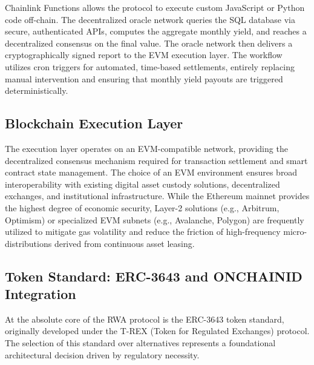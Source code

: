 \documentclass[12pt, a4paper]{article}
\begin{document}
Chainlink Functions allows the protocol to execute custom JavaScript or Python code off-chain. The decentralized oracle network queries the SQL database via secure, authenticated APIs, computes the aggregate monthly yield, and reaches a decentralized consensus on the final value. The oracle network then delivers a cryptographically signed report to the EVM execution layer. The workflow utilizes cron triggers for automated, time-based settlements, entirely replacing manual intervention and ensuring that monthly yield payouts are triggered deterministically.

\subsection{Blockchain Execution Layer}
The execution layer operates on an EVM-compatible network, providing the decentralized consensus mechanism required for transaction settlement and smart contract state management. The choice of an EVM environment ensures broad interoperability with existing digital asset custody solutions, decentralized exchanges, and institutional infrastructure. While the Ethereum mainnet provides the highest degree of economic security, Layer-2 solutions (e.g., Arbitrum, Optimism) or specialized EVM subnets (e.g., Avalanche, Polygon) are frequently utilized to mitigate gas volatility and reduce the friction of high-frequency micro-distributions derived from continuous asset leasing.

\subsection{Token Standard: ERC-3643 and ONCHAINID Integration}
At the absolute core of the RWA protocol is the ERC-3643 token standard, originally developed under the T-REX (Token for Regulated Exchanges) protocol. The selection of this standard over alternatives represents a foundational architectural decision driven by regulatory necessity.
\end{document}
